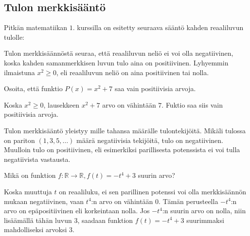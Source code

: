 \subsection*{Tulon merkkisääntö}

Pitkän matematiikan $1$. kurssilla on esitetty seuraava sääntö kahden reaaliluvun tulolle:


Tulon merkkisäännöstä seuraa, että reaaliluvun neliö ei voi olla negatiivinen, koska kahden samanmerkkisen luvun tulo aina on positiivinen. Lyhyemmin ilmaistuna $x^2 \geq 0$, eli reaaliluvun neliö on aina  positiivinen tai nolla.

\begin{esimerkki}
Osoita, että funktio $P(x)=x^2+7$ saa vain positiivisia arvoja.
    \begin{esimratk}
	Koska $x^2 \geq 0$, lausekkeen $x^2+7$ arvo on vähintään $7$. Fuktio saa siis
	vain positiivisia arvoja.
    \end{esimratk}
\end{esimerkki}

Tulon merkkisääntö yleistyy mille tahansa määrälle tulontekijöitä. Mikäli tulossa on pariton $(1, 3, 5, \ldots)$ määrä negatiivisia tekijöitä, tulo on negatiivinen. Muulloin tulo on positiivinen, eli esimerkiksi parillisesta potenssista ei voi tulla negatiivista vastausta.

\begin{esimerkki}
Mikä on funktion $f:\mathbb{R} \rightarrow \mathbb{R}, f(t)=-t^4+3$ suurin arvo?
    \begin{esimratk}
Koska muuttuja $t$ on reaaliluku, ei sen parillinen potenssi voi olla merkkisäännön mukaan negatiivinen, vaan $t^4$:n arvo on vähintään $0$. Tämän perusteella $-t^4$:n arvo on epäpositiivinen eli korkeintaan nolla. Jos $-t^4$:n suurin arvo on nolla, niin lisäämällä tähän luvun $3$, saadaan funktion $f(t)=-t^4+3$ suurimmaksi mahdolliseksi arvoksi $3$.
    \end{esimratk}
\end{esimerkki}

